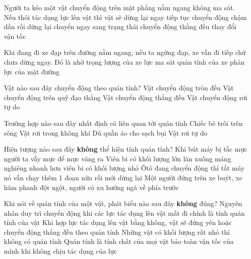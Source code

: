 \begin{ex}%
Người ta kéo một vật chuyển động trên mặt phẳng nằm ngang không ma sát. Nếu thôi tác dụng lực lên vật thì vật sẽ
\choice
{dừng lại ngay}
{tiếp tục chuyển động chậm dần rồi dừng lại}
{\True chuyển ngay sang trạng thái chuyển động thẳng đều}
{thay đổi vận tốc}
 \end{ex}
\begin{ex}%
Khi đang đi xe đạp trên đường nằm ngang, nếu ta ngừng đạp, xe vẫn đi tiếp chứ chưa dừng ngay. Đó là nhờ
\choice
{trọng lượng của xe}
{lực ma sát}
{\True quán tính của xe}
{phản lực của mặt đường}
  \end{ex}
\begin{ex}%
Vật nào sau đây chuyển động theo quán tính?
\choice
{Vật chuyển động tròn đều}
{Vật chuyển động trên quỹ đạo thẳng}
{\True Vật chuyển động thẳng đều}
{Vật chuyển động rơi tự do}
  \end{ex}
\begin{ex}%
Trường hợp nào sau đây nhất định có liên quan tới quán tính
\choice
{Chiếc bè trôi trên sông}
{Vật rơi trong không khí}
{\True Dũ quần áo cho sạch bụi}
{Vật rơi tự do}
\loigiai{
}  \end{ex}
\begin{ex}%
Hiện tượng nào sau đây \textbf{không} thể hiện tính quán tính?
\choice
{Khi bút máy bị tắc mực người ta vẫy mực để mực văng ra}
{\True Viên bi có khối lượng lớn lăn xuống máng nghiêng nhanh hơn viên bi có khối lượng nhỏ}
{Ôtô đang chuyển động thì tắt máy nó vẫn chạy thêm 1 đoạn nữa rồi mới dừng lại}
{Một người đứng trên xe buýt, xe hãm phanh đột ngột, người có xu hướng ngã về phía trước}
  \end{ex}
\begin{ex}%
Khi nói về quán tính của một vật, phát biểu nào sau đây \textbf{không} đúng?
\choice
{Nguyên nhân duy trì chuyển động khi các lực tác dụng lên vật mất đi chính là tính quán tính của vật}
{Khi hợp lực tác dụng lên vật bằng không, vật sẽ đứng yên hoặc chuyển động thẳng đều theo quán tính}
{\True Những vật có khối lượng rất nhỏ thì không có quán tính}
{Quán tính là tính chất của mọi vật bảo toàn vận tốc của mình khi không chịu tác dụng của lực}
 \end{ex}
